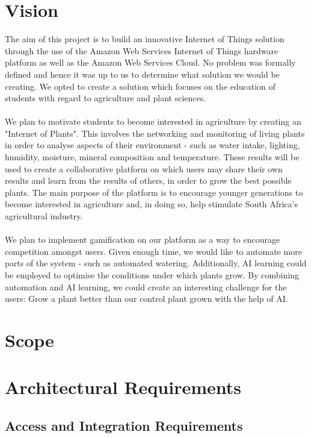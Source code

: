 \documentclass{article}
\begin{document}
\section{Vision}
The aim of this project is to build an innovative Internet of Things solution through the use of the Amazon Web Services Internet of Things hardware platform as well as the Amazon Web Services Cloud. No problem was formally defined and hence it was up to us to determine what solution we would be creating. We opted to create a solution which focuses on the education of students with regard to agriculture and plant sciences.\\\\
We plan to motivate students to become interested in agriculture by creating an "Internet of Plants". This involves the networking and monitoring of living plants in order to analyse aspects of their environment - such as water intake, lighting, humidity, moisture, mineral composition and temperature. These results will be used to create a collaborative platform on which users may share their own results and learn from the results of others, in order to grow the best possible plants. The main purpose of the platform is to encourage younger generations to become interested in agriculture and, in doing so, help stimulate South Africa's agricultural industry.\\\\
We plan to implement gamification on our platform as a way to encourage competition amongst users. Given enough time, we would like to automate more parts of the system - such as automated watering. Additionally, AI learning could be employed to optimise the conditions under which plants grow. By combining automation and AI learning, we could create an interesting challenge for the
users: Grow a plant better than our control plant grown with the help of AI.
\cleardoublepage

\section{Scope}

\cleardoublepage

\section{Architectural Requirements}
\subsection{Access and Integration Requirements}
\end{document}
